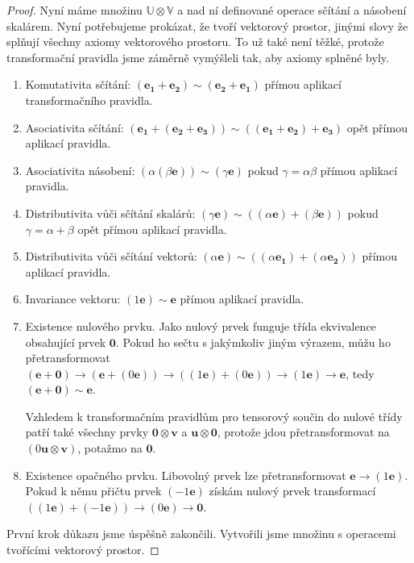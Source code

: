 \documentclass[a5paper,12pt]{amsbook}
\theoremstyle{definition}
\newcommand{\myvec}[1]{\bm{#1}}
\newcommand{\myspace}[1]{\mathbb{#1}}
\begin{document}
\begin{proof}
Nyní máme množinu $\myspace{U}\otimes\myspace{V}$ a nad ní definované operace sčítání
a násobení skalárem. Nyní potřebujeme prokázat, že tvoří vektorový prostor, jinými slovy
že splňují všechny axiomy vektorového prostoru. To už také není těžké, protože
transformační pravidla jsme záměrně vymýšleli tak, aby axiomy splněné byly.
\begin{enumerate}
\item Komutativita sčítání: $(\myvec{e_1} + \myvec{e_2}) \sim (\myvec{e_2} + \myvec{e_1})$
    přímou aplikací transformačního pravidla.
\item Asociativita sčítání: $(\myvec{e_1} + (\myvec{e_2} + \myvec{e_3})) 
    \sim ((\myvec{e_1} + \myvec{e_2}) + \myvec{e_3})$ opět přímou aplikací pravidla.
\item Asociativita násobení: $(\alpha(\beta\myvec{e})) \sim (\gamma\myvec{e})$
    pokud $\gamma = \alpha\beta$ přímou aplikací pravidla.
\item Distributivita vůči sčítání skalárů: $(\gamma\myvec{e}) 
    \sim ((\alpha\myvec{e}) + (\beta\myvec{e}))$ pokud $\gamma = \alpha + \beta$
    opět přímou aplikací pravidla.
\item Distributivita vůči sčítání vektorů: $(\alpha\myvec{e}) 
    \sim ((\alpha\myvec{e_1}) + (\alpha\myvec{e_2}))$ přímou aplikací pravidla.
\item Invariance vektoru: $(1\myvec{e}) \sim \myvec{e}$ přímou aplikací pravidla.
\item Existence nulového prvku. Jako nulový prvek funguje třída ekvivalence obsahující
    prvek $\myvec{0}$. Pokud ho sečtu s jakýmkoliv jiným výrazem, můžu ho
    přetransformovat $(\myvec{e} + \myvec{0}) \rightarrow (\myvec{e} + (0\myvec{e}))
    \rightarrow ((1\myvec{e}) + (0\myvec{e})) \rightarrow (1\myvec{e}) \rightarrow \myvec{e}$,
    tedy $(\myvec{e} + \myvec{0}) \sim \myvec{e}$.
    
    Vzhledem k transformačním pravidlům pro tensorový součin do nulové třídy patří také
    všechny prvky $\myvec{0}\otimes\myvec{v}$ a $\myvec{u}\otimes\myvec{0}$, protože
    jdou přetransformovat na $(0\myvec{u}\otimes\myvec{v})$, potažmo na $\myvec{0}$.
\item Existence opačného prvku. Libovolný prvek lze přetransformovat $\myvec{e} 
    \rightarrow (1\myvec{e})$. Pokud k němu přičtu prvek $(-1\myvec{e})$ získám nulový prvek
    transformací $((1\myvec{e}) + (-1\myvec{e})) \rightarrow (0\myvec{e}) \rightarrow \myvec{0}$.
\end{enumerate}
První krok důkazu jsme úspěšně zakončili. Vytvořili jsme množinu s operacemi tvořícími vektorový
prostor.


\end{proof}
\end{document}
